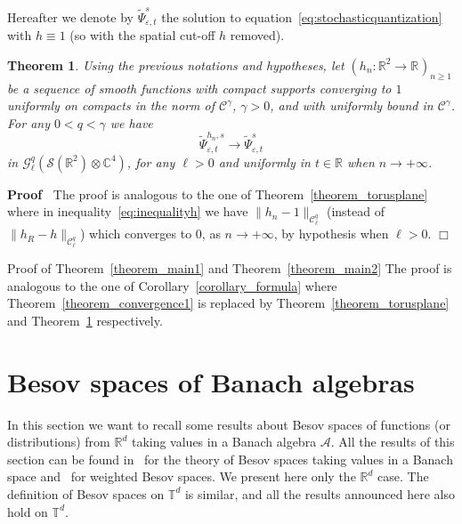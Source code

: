\documentclass{article}
\newenvironment{proof}{\noindent\textbf{Proof\ }}{\hspace*{\fill}$\Box$\medskip}
\newenvironment{proof*}[1]{\noindent\textbf{#1\ }}{\hspace*{\fill}$\Box$\medskip}
\newtheorem{theorem}{Theorem}
\begin{document}
Hereafter we denote by $\tilde{\Psi}_{\varepsilon, t}^s$ the solution to
equation~{\eqref{eq:stochasticquantization}} with $h \equiv 1$ (so with the
spatial cut-off $h$ removed).

\begin{theorem}
  \label{theorem_cutoffh}Using the previous notations and hypotheses, let
  $(h_n : \mathbb{R}^2 \rightarrow \mathbb{R}^{}_{})_{n \geqslant 1}$ be a
  sequence of smooth functions with compact supports converging to $1$
  uniformly on compacts in the norm of $\mathcal{C}^{\gamma}$, $\gamma > 0$,
  and with uniformly bound in $\mathcal{C}^{\gamma}$. For any $0 < q < \gamma$
  we have
  \[ \tilde{\Psi}_{\varepsilon, t}^{h_n, s} \rightarrow
     \tilde{\Psi}_{\varepsilon, t}^s \]
  in $\mathcal{G}^q_{\ell} (\mathcal{S} (\mathbb{R}^2) \otimes \mathbb{C}^4)$,
  for any $\ell > 0$ and uniformly in $t \in \mathbb{R}$ when $n \rightarrow +
  \infty$.
\end{theorem}

\begin{proof}
  The proof is analogous to the one of Theorem~\ref{theorem_torusplane} where
  in inequality~{\eqref{eq:inequalityh}} we have $\| h_n - 1
  \|_{\mathcal{C}^q_{\ell}}$ (instead of $\| h_R - h
  \|_{\mathcal{C}^q_{\ell}}$) which converges to $0$, as $n \rightarrow +
  \infty$, by hypothesis when $\ell > 0$.
\end{proof}

\begin{proof*}{Proof of Theorem~\ref{theorem_main1} and
Theorem~\ref{theorem_main2}}
  The proof is analogous to the one of Corollary~\ref{corollary_formula} where
  Theorem~\ref{theorem_convergence1} is replaced by
  Theorem~\ref{theorem_torusplane} and Theorem~\ref{theorem_cutoffh}
  respectively.
\end{proof*}

\appendix\section{Besov spaces of Banach algebras}\label{appendix_Besov}

In this section we want to recall some results about Besov spaces of functions
(or distributions) from $\mathbb{R}^d$ taking values in a Banach algebra
$\mathcal{A}$. All the results of this section can be found
in~{\cite{Amann1997,Amann2019}} for the theory of Besov spaces taking values
in a Banach space and~{\cite{TriebelIII}} for weighted Besov spaces. We
present here only the $\mathbb{R}^d$ case. The definition of Besov spaces on
$\mathbb{T}^d$ is similar, and all the results announced here also hold on
$\mathbb{T}^d$.
\end{document}
